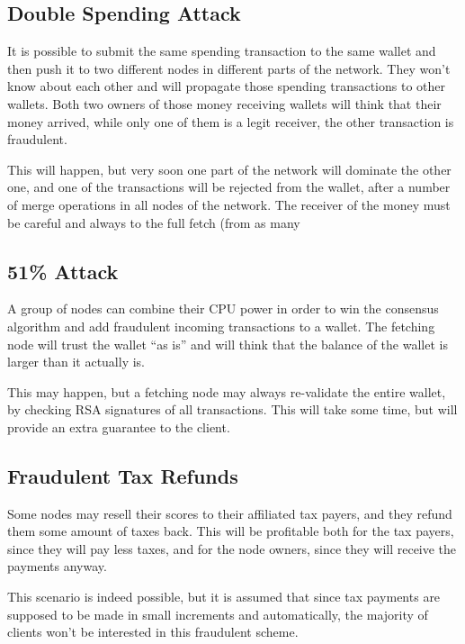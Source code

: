 \documentclass[11pt,oneside]{article}
\begin{document}
\subsection{Double Spending Attack}

It is possible to submit the same spending transaction to the same wallet
and then push it to two different nodes in different parts of the network.
They won't know about each other and will propagate those spending
transactions to other wallets. Both two owners of those money receiving
wallets will think that their money arrived, while only one of them is
a legit receiver, the other transaction is fraudulent.

This will happen, but very soon one part of the network will dominate the other
one, and one of the transactions will be rejected from the wallet, after
a number of merge operations in all nodes of the network. The receiver of the
money must be careful and always to the full fetch (from as many

\subsection{51\% Attack}

A group of nodes can combine their CPU power in order to win the consensus
algorithm and add fraudulent incoming transactions to a wallet.
The fetching node will trust the wallet ``as is'' and will think that the
balance of the wallet is larger than it actually is.

This may happen, but a fetching node may always re-validate the entire wallet,
by checking RSA signatures of all transactions. This will take some time, but will
provide an extra guarantee to the client.

\subsection{Fraudulent Tax Refunds}

Some nodes may resell their scores to their affiliated tax payers, and they
refund them some amount of taxes back. This will be profitable both for
the tax payers, since they will pay less taxes, and for the node owners,
since they will receive the payments anyway.

This scenario is indeed possible, but it is assumed that since tax payments are
supposed to be made in small increments and automatically, the majority of
clients won't be interested in this fraudulent scheme.

\printbibliography%
\end{document}
